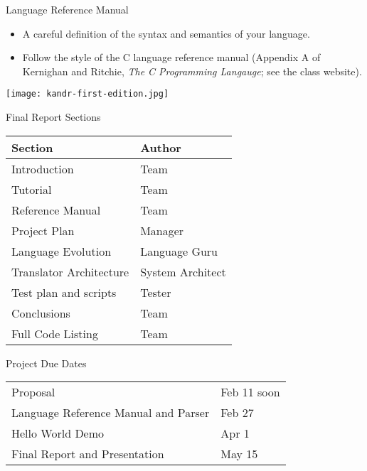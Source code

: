\documentclass{plt}
\begin{document}
\begin{frame}{Language Reference Manual}

  \begin{itemize}
    \itemsep=15pt

\item A careful definition of the syntax and semantics of your language.

\item Follow the style of the C language reference manual (Appendix A of
Kernighan and Ritchie, \emph{The C Programming Langauge}; see the
class website).

\end{itemize}

\centerline{\texttt{[image: kandr-first-edition.jpg]}}

\end{frame}

\begin{frame}{Final Report Sections}
\renewcommand\arraystretch{1.2}
\begin{tabular}{ll}
\toprule
\textbf{Section} & \textbf{Author} \\
\midrule
Introduction & Team \\
Tutorial & Team \\
Reference Manual & Team \\
Project Plan & Manager \\
Language Evolution & Language Guru \\
Translator Architecture & System Architect \\
Test plan and scripts & Tester \\
Conclusions & Team \\
Full Code Listing & Team \\
\bottomrule
\end{tabular}

\end{frame}

\begin{frame}{Project Due Dates}

\renewcommand{\arraystretch}{2}
\begin{tabular}{@{}ll@{}}
Proposal & Feb 11 \alert{soon} \\
Language Reference Manual and Parser & Feb 27 \\
Hello World Demo & Apr 1 \\
Final Report and Presentation  & May 15 \\
\end{tabular}

\end{frame}
\end{document}
